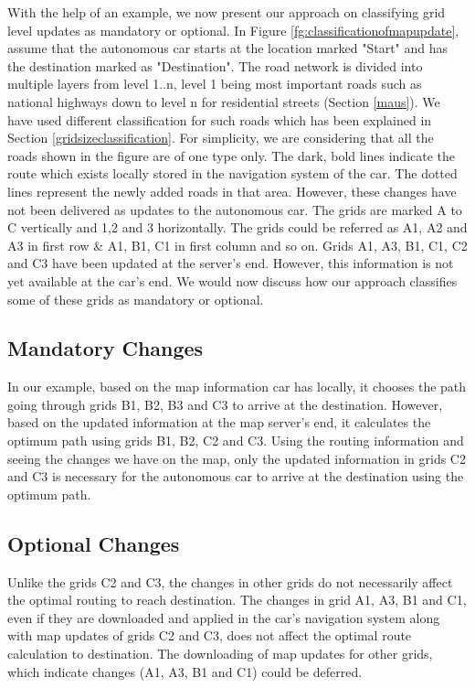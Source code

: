 With the help of an example, we now present our approach on classifying grid level updates as mandatory or optional. In Figure \ref{fg:classificationofmapupdate}, assume that the autonomous car starts at the location marked "Start" and has the destination marked as "Destination". The road network is divided into multiple layers from level 1..n, level 1 being most important roads such as national highways down to level n for residential streets (Section \ref{maus}). We have used different classification for such roads which has been explained in Section \ref{gridsizeclassification}. For simplicity, we are considering that all the roads shown in the figure are of one type only. The dark, bold lines indicate the route which exists locally stored in the navigation system of the car. The dotted lines represent the newly added roads in that area. However, these changes have not been delivered as updates to the autonomous car. The grids are marked A to C vertically and 1,2 and 3 horizontally. The grids could be referred as A1, A2 and A3 in first row \& A1, B1, C1 in first column and so on. Grids A1, A3, B1, C1, C2 and C3 have been updated at the server's end. However, this information is not yet available at the car's end. We would now discuss how our approach classifies some of these grids as mandatory or optional.
\subsection{Mandatory Changes}
In our example, based on the map information car has locally, it chooses the path going through grids B1, B2, B3 and C3 to arrive at the destination. However, based on the updated information at the map server's end, it calculates the optimum path using grids B1, B2, C2 and C3. Using the routing information and seeing the changes we have on the map, only the updated information in grids C2 and C3 is necessary for the autonomous car to arrive at the destination using the optimum path. 
\subsection{Optional Changes}
Unlike the grids C2 and C3, the changes in other grids do not necessarily affect the optimal routing to reach destination. The changes in grid A1, A3, B1 and C1, even if they are downloaded and applied in the car's navigation system along with map updates of grids C2 and C3, does not affect the optimal route calculation to destination. The downloading of map updates for other grids, which indicate changes (A1, A3, B1 and C1) could be deferred. 
